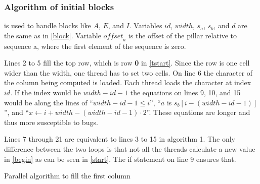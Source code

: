 \subsubsection{Algorithm of initial blocks}
 is used to handle blocks like $A$, $E$, and $I$.
Variables $id$, $width$, $s_a$, $s_b$, and $d$ are the same as in \cref{block}.
Variable $\mathit{offset}_a$ is the offset of the pillar relative to sequence a, where the first element of the sequence is zero.

Lines 2 to 5 fill the top row, which is row \textbf{0} in \cref{tstart}.
Since the row is one cell wider than the width, one thread has to set two cells.
On line 6 the character of the column being computed is loaded.
Each thread loads the character at index $id$.
If the index would be $width - id - 1$ the equations on lines 9, 10, and 15 would be along the lines of ``$width - id - 1 \leq i$'', ``$a$ is $s_b[i-(width-id-1)]$'', and ``$x \gets i + width - (width - id - 1) \cdot 2$''.
These equations are longer and thus more susceptible to bugs.

Lines 7 through 21 are equivalent to lines 3 to 15 in algorithm 1.
The only difference between the two loops is that not all the threads calculate a new value in \cref{begin} as can be seen in \cref{start}.
The if statement on line 9 ensures that.

\begin{algorithm}[ht]
\caption{Parallel algorithm to fill the first column} \label{fill_column}
\begin{algorithmic}[1]
    \Statex
    \Statex
    \EndWhile
\EndProcedure
\end{algorithmic}
\end{algorithm}

